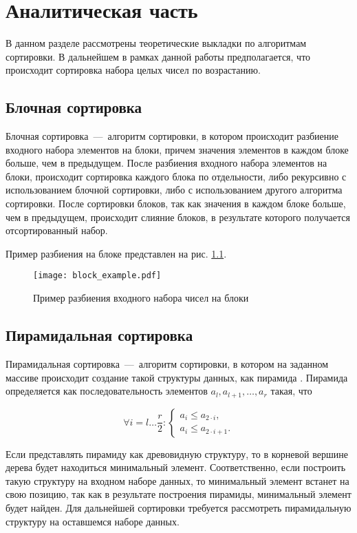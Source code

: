 \chapter{Аналитическая часть}

В данном разделе рассмотрены теоретические выкладки по алгоритмам сортировки. В дальнейшем в рамках данной работы предполагается, что происходит сортировка набора целых чисел по возрастанию.

\section{Блочная сортировка}
Блочная сортировка~---~алгоритм сортировки, в котором происходит разбиение входного набора элементов на блоки, причем значения элементов в каждом блоке больше, чем в предыдущем.
После разбиения входного набора элементов на блоки, происходит сортировка каждого блока по отдельности, либо рекурсивно с использованием блочной сортировки, либо с использованием другого алгоритма сортировки.
После сортировки блоков, так как значения в каждом блоке больше, чем в предыдущем, происходит слияние блоков, в результате которого получается отсортированный набор.

Пример разбиения на блоке представлен на рис. \ref{img:block_example}.

\begin{figure}[h!]
\centering
    \texttt{[image: block\_example.pdf]}
    \caption{Пример разбиения входного набора чисел на блоки}
    \label{img:block_example}	
\end{figure}


\section{Пирамидальная сортировка}
Пирамидальная сортировка~---~алгоритм сортировки, в котором на заданном массиве происходит создание такой структуры данных, как пирамида \cite{bib:heapsort_info}. 
Пирамида определяется как последовательность элементов $a_{l}, a_{l+1}, \ldots, a_{r}$ такая, что 

\begin{equation}
	\forall i = l \ldots \frac{r}{2}: \begin{cases}
		a_{i} \le a_{2 \cdot i}, \\
		a_{i} \le a_{2 \cdot i + 1}.
	\end{cases}
\end{equation}

Если представлять пирамиду как древовидную структуру, то в корневой вершине дерева будет находиться минимальный элемент. 
Соответственно, если построить такую структуру на входном наборе данных, то минимальный элемент встанет на свою позицию, так как в результате построения пирамиды, минимальный элемент будет найден.
 Для дальнейшей сортировки требуется рассмотреть пирамидальную структуру на оставшемся наборе данных.


